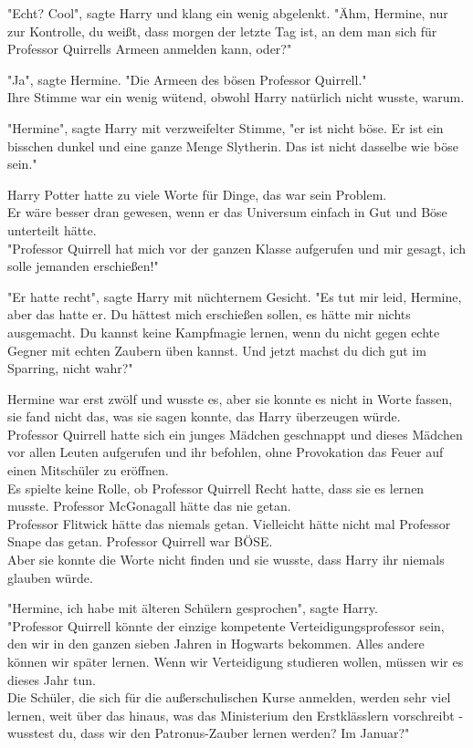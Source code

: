 {"Echt? Cool", sagte Harry und klang ein wenig abgelenkt. "Ähm, Hermine, nur zur Kontrolle, du weißt, dass morgen der letzte Tag ist, an dem man sich für Professor Quirrells Armeen anmelden kann, oder?"

"Ja", sagte Hermine. "Die Armeen des bösen Professor Quirrell."\\ Ihre Stimme war ein wenig wütend, obwohl Harry natürlich nicht wusste, warum.

"Hermine", sagte Harry mit verzweifelter Stimme, "er ist nicht böse. Er ist ein bisschen dunkel und eine ganze Menge Slytherin. Das ist nicht dasselbe wie böse sein."

Harry Potter hatte zu viele Worte für Dinge, das war sein Problem.\\ Er wäre besser dran gewesen, wenn er das Universum einfach in Gut und Böse unterteilt hätte.\\ "Professor Quirrell hat mich vor der ganzen Klasse aufgerufen und mir gesagt, ich solle jemanden erschießen!"

"Er hatte recht", sagte Harry mit nüchternem Gesicht. "Es tut mir leid, Hermine, aber das hatte er. Du hättest mich erschießen sollen, es hätte mir nichts ausgemacht. Du kannst keine Kampfmagie lernen, wenn du nicht gegen echte Gegner mit echten Zaubern üben kannst. Und jetzt machst du dich gut im Sparring, nicht wahr?"

Hermine war erst zwölf und wusste es, aber sie konnte es nicht in Worte fassen, sie fand nicht das, was sie sagen konnte, das Harry überzeugen würde.\\ Professor Quirrell hatte sich ein junges Mädchen geschnappt und dieses Mädchen vor allen Leuten aufgerufen und ihr befohlen, ohne Provokation das Feuer auf einen Mitschüler zu eröffnen.\\ Es spielte keine Rolle, ob Professor Quirrell Recht hatte, dass sie es lernen musste. Professor McGonagall hätte das nie getan.\\ Professor Flitwick hätte das niemals getan. Vielleicht hätte nicht mal Professor Snape das getan. Professor Quirrell war BÖSE.\\ Aber sie konnte die Worte nicht finden und sie wusste, dass Harry ihr niemals glauben würde.

"Hermine, ich habe mit älteren Schülern gesprochen", sagte Harry.\\ "Professor Quirrell könnte der einzige kompetente Verteidigungsprofessor sein, den wir in den ganzen sieben Jahren in Hogwarts bekommen. Alles andere können wir später lernen. Wenn wir Verteidigung studieren wollen, müssen wir es dieses Jahr tun.\\ Die Schüler, die sich für die außerschulischen Kurse anmelden, werden sehr viel lernen, weit über das hinaus, was das Ministerium den Erstklässlern vorschreibt - wusstest du, dass wir den Patronus-Zauber lernen werden? Im Januar?"

}
